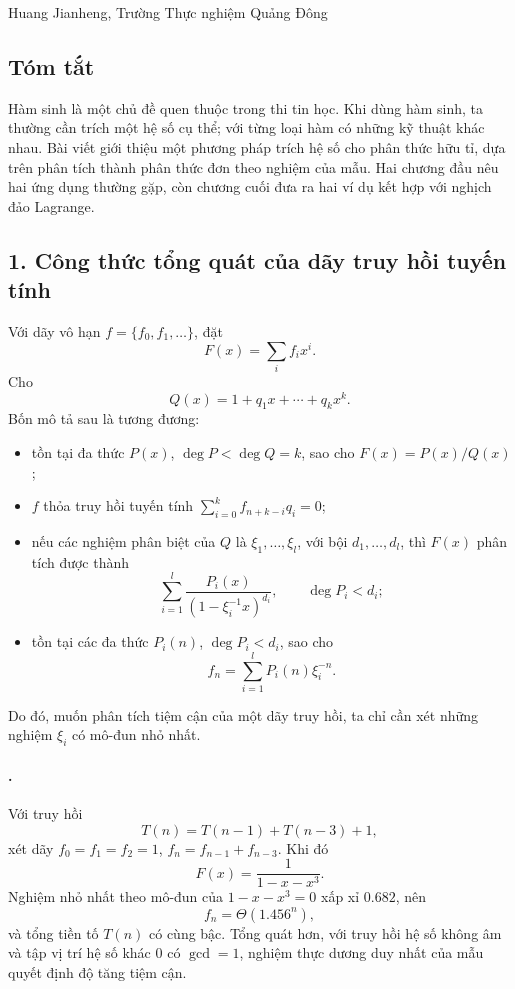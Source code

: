 \documentclass[11pt]{article}
\begin{document}
\begin{center}
Huang Jianheng, Trường Thực nghiệm Quảng Đông
\end{center}

\subsection*{Tóm tắt}

Hàm sinh là một chủ đề quen thuộc trong thi tin học. Khi dùng hàm sinh, ta
thường cần trích một hệ số cụ thể; với từng loại hàm có những kỹ thuật khác
nhau. Bài viết giới thiệu một phương pháp trích hệ số cho phân thức hữu tỉ,
dựa trên phân tích thành phân thức đơn theo nghiệm của mẫu. Hai chương đầu
nêu hai ứng dụng thường gặp, còn chương cuối đưa ra hai ví dụ kết hợp với
nghịch đảo Lagrange.

\subsection*{1. Công thức tổng quát của dãy truy hồi tuyến tính}

Với dãy vô hạn \(f=\{f_0,f_1,\ldots\}\), đặt
\[
  F(x)=\sum_i f_i x^i.
\]
Cho
\[
  Q(x)=1+q_1x+\cdots+q_kx^k.
\]
Bốn mô tả sau là tương đương:
\begin{itemize}
  \item tồn tại đa thức \(P(x)\), \(\deg P<\deg Q=k\), sao cho
  \(F(x)=P(x)/Q(x)\);
  \item \(f\) thỏa truy hồi tuyến tính
  \(\sum_{i=0}^{k} f_{n+k-i}q_i=0\);
  \item nếu các nghiệm phân biệt của \(Q\) là
  \(\xi_1,\ldots,\xi_l\), với bội \(d_1,\ldots,d_l\), thì
  \(F(x)\) phân tích được thành
  \[
    \sum_{i=1}^{l}\frac{P_i(x)}{(1-\xi_i^{-1}x)^{d_i}},
    \qquad \deg P_i<d_i;
  \]
  \item tồn tại các đa thức \(P_i(n)\), \(\deg P_i<d_i\), sao cho
  \[
    f_n=\sum_{i=1}^{l} P_i(n)\xi_i^{-n}.
  \]
\end{itemize}
Do đó, muốn phân tích tiệm cận của một dãy truy hồi, ta chỉ cần xét những
nghiệm \(\xi_i\) có mô-đun nhỏ nhất.

\paragraph{.}
Với truy hồi
\[
  T(n)=T(n-1)+T(n-3)+1,
\]
xét dãy \(f_0=f_1=f_2=1\), \(f_n=f_{n-1}+f_{n-3}\). Khi đó
\[
  F(x)=\frac{1}{1-x-x^3}.
\]
Nghiệm nhỏ nhất theo mô-đun của \(1-x-x^3=0\) xấp xỉ \(0.682\), nên
\[
  f_n=\Theta(1.456^n),
\]
và tổng tiền tố \(T(n)\) có cùng bậc. Tổng quát hơn, với truy hồi hệ số không
âm và tập vị trí hệ số khác \(0\) có \(\gcd=1\), nghiệm thực dương duy nhất
của mẫu quyết định độ tăng tiệm cận.
\end{document}

